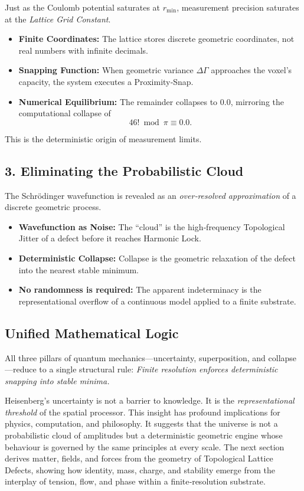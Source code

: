 \documentclass[reprint,amsmath,amssymb,aps,prl,floatfix]{revtex4-2}
\begin{document}
\begin{itemize}
Just as the Coulomb potential saturates at \(r_{\min}\), measurement precision saturates at the \textit{Lattice Grid Constant}.
\begin{itemize}
\item \textbf{Finite Coordinates:} The lattice stores discrete geometric coordinates, not real numbers with infinite decimals.  
\item \textbf{Snapping Function:} When geometric variance \(\Delta\Gamma\) approaches the voxel’s capacity, the system executes a Proximity‑Snap.  
\item \textbf{Numerical Equilibrium:} The remainder collapses to 0.0, mirroring the computational collapse of  
\[
46! \bmod \pi \equiv 0.0.
\]
\end{itemize}
\medskip
This is the deterministic origin of measurement limits.

\subsection{3. Eliminating the Probabilistic Cloud}

The Schrödinger wavefunction is revealed as an \textit{over‑resolved approximation} of a discrete geometric process.
\begin{itemize}
\item \textbf{Wavefunction as Noise:} The “cloud” is the high‑frequency Topological Jitter of a defect before it reaches Harmonic Lock.  
\item \textbf{Deterministic Collapse:} Collapse is the geometric relaxation of the defect into the nearest stable minimum.  
\item \textbf{No randomness is required:} The apparent indeterminacy is the representational overflow of a continuous model applied to a finite substrate.
\end{itemize}
\medskip

\subsection{Unified Mathematical Logic}

All three pillars of quantum mechanics—uncertainty, superposition, and collapse—reduce to a single structural rule:
\medskip
\textit{Finite resolution enforces deterministic snapping into stable minima.}
\medskip

Heisenberg’s uncertainty is not a barrier to knowledge.  
It is the \textit{representational threshold} of the spatial processor.
\medskip
This insight has profound implications for physics, computation, and philosophy. It suggests that the universe is not a probabilistic cloud of amplitudes but a deterministic geometric engine whose behaviour is governed by the same principles at every scale. 
\medskip
The next section derives matter, fields, and forces from the geometry of Topological Lattice Defects, showing how identity, mass, charge, and stability emerge from the interplay of tension, flow, and phase within a finite‑resolution substrate.   


\end{itemize}
\end{document}
